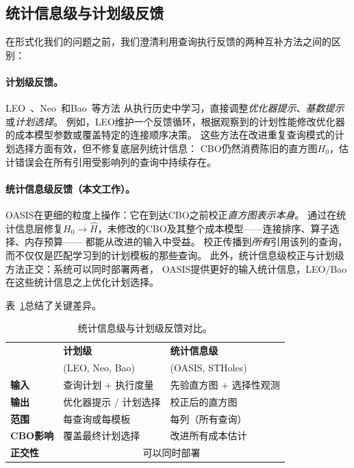 \documentclass[runningheads]{llncs}
\begin{document}
\subsection{统计信息级与计划级反馈}
\label{sec:two_levels}

在形式化我们的问题之前，我们澄清利用查询执行反馈的两种互补方法之间的区别：

\paragraph{计划级反馈。}
LEO~\cite{stillger2001leo}、Neo~\cite{marcus2019neo}和Bao~\cite{marcus2022bao}等方法
从执行历史中学习，直接调整\emph{优化器提示}、\emph{基数提示}或\emph{计划选择}。
例如，LEO维护一个反馈循环，根据观察到的计划性能修改优化器的成本模型参数或覆盖特定的连接顺序决策。
这些方法在改进重复查询模式的计划选择方面有效，但不修复底层列统计信息：
CBO仍然消费陈旧的直方图$H_0$，估计错误会在所有引用受影响列的查询中持续存在。

\paragraph{统计信息级反馈（本文工作）。}
OASIS在更细的粒度上操作：它在到达CBO之前校正\emph{直方图表示本身}。
通过在统计信息层修复$H_0 \to \hat{H}$，未修改的CBO及其整个成本模型——连接排序、算子选择、内存预算——
都能从改进的输入中受益。
校正传播到\emph{所有}引用该列的查询，而不仅仅是匹配学习到的计划模板的那些查询。
此外，统计信息级校正与计划级方法正交：系统可以同时部署两者，
OASIS提供更好的输入统计信息，LEO/Bao在这些统计信息之上优化计划选择。

表~\ref{tab:two_levels}总结了关键差异。

\begin{table}[t]
  \centering
  \caption{统计信息级与计划级反馈对比。}
  \label{tab:two_levels}
  \setlength{\tabcolsep}{5pt}
  \begin{tabular}{l p{3.2cm} p{3.2cm}}
    \toprule
    & \textbf{计划级} & \textbf{统计信息级} \\
    & (LEO, Neo, Bao) & (OASIS, STHoles) \\
    \midrule
    \textbf{输入}
      & 查询计划 + 执行度量
      & 先验直方图 + 选择性观测 \\
    \textbf{输出}
      & 优化器提示 / 计划选择
      & 校正后的直方图 \\
    \textbf{范围}
      & 每查询或每模板
      & 每列（所有查询） \\
    \textbf{CBO影响}
      & 覆盖最终计划选择
      & 改进所有成本估计 \\
    \textbf{正交性}
      & \multicolumn{2}{c}{可以同时部署} \\
    \bottomrule
  \end{tabular}
\end{table}
\end{document}

